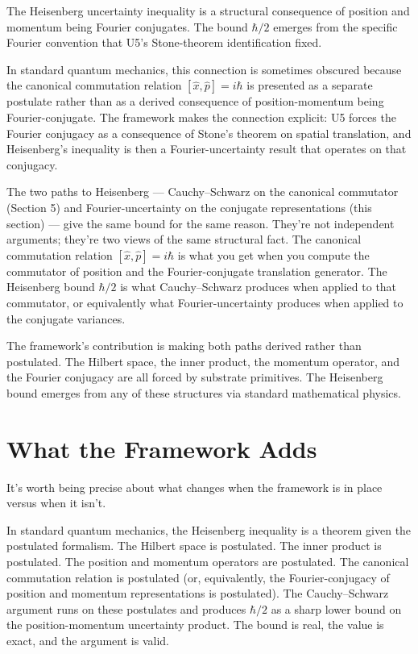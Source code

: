 \documentclass[11pt,a4paper]{article}
\begin{document}
The Heisenberg uncertainty inequality is a structural consequence of position and momentum being Fourier conjugates. The bound $\hbar/2$ emerges from the specific Fourier convention that U5's Stone-theorem identification fixed.

In standard quantum mechanics, this connection is sometimes obscured because the canonical commutation relation $[\hat{x}, \hat{p}] = i\hbar$ is presented as a separate postulate rather than as a derived consequence of position-momentum being Fourier-conjugate. The framework makes the connection explicit: U5 forces the Fourier conjugacy as a consequence of Stone's theorem on spatial translation, and Heisenberg's inequality is then a Fourier-uncertainty result that operates on that conjugacy.

The two paths to Heisenberg --- Cauchy--Schwarz on the canonical commutator (Section 5) and Fourier-uncertainty on the conjugate representations (this section) --- give the same bound for the same reason. They're not independent arguments; they're two views of the same structural fact. The canonical commutation relation $[\hat{x}, \hat{p}] = i\hbar$ is what you get when you compute the commutator of position and the Fourier-conjugate translation generator. The Heisenberg bound $\hbar/2$ is what Cauchy--Schwarz produces when applied to that commutator, or equivalently what Fourier-uncertainty produces when applied to the conjugate variances.

The framework's contribution is making both paths derived rather than postulated. The Hilbert space, the inner product, the momentum operator, and the Fourier conjugacy are all forced by substrate primitives. The Heisenberg bound emerges from any of these structures via standard mathematical physics.

\section{What the Framework Adds}

It's worth being precise about what changes when the framework is in place versus when it isn't.

In standard quantum mechanics, the Heisenberg inequality is a theorem given the postulated formalism. The Hilbert space is postulated. The inner product is postulated. The position and momentum operators are postulated. The canonical commutation relation is postulated (or, equivalently, the Fourier-conjugacy of position and momentum representations is postulated). The Cauchy--Schwarz argument runs on these postulates and produces $\hbar/2$ as a sharp lower bound on the position-momentum uncertainty product. The bound is real, the value is exact, and the argument is valid.
\end{document}
